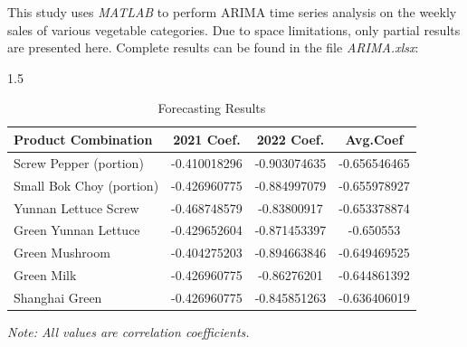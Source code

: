 \documentclass{article}
\begin{document}
	This study uses \textit{MATLAB} to perform ARIMA time series analysis on the weekly sales of various vegetable categories. Due to space limitations, only partial results are presented here. Complete results can be found in the file \textit{ARIMA.xlsx}:
	
	\begin{table}[h]
		\centering
		\caption{Forecasting Results}
		\renewcommand{\heavyrulewidth}{1.2pt}
		\begin{spacing}{1.5} %
			\begin{tabular}{@{}lccc@{}}
				\toprule
				\textbf{\centering Product Combination} & \textbf{2021 Coef.} & \textbf{2022 Coef.} & \textbf{Avg.Coef} \\
				\midrule
				Screw Pepper (portion) & -0.410018296 & -0.903074635 & -0.656546465 \\
				Small Bok Choy (portion) & -0.426960775 & -0.884997079 & -0.655978927 \\
				Yunnan Lettuce Screw & -0.468748579 & -0.83800917 & -0.653378874 \\
				Green Yunnan Lettuce & -0.429652604 & -0.871453397 & -0.650553 \\
				Green Mushroom & -0.404275203 & -0.894663846 & -0.649469525 \\
				Green Milk & -0.426960775 & -0.86276201 & -0.644861392 \\
				Shanghai Green & -0.426960775 & -0.845851263 & -0.636406019 \\
				\bottomrule
			\end{tabular}
		\end{spacing}
		\footnotesize \textit{Note: All values are correlation coefficients.}
	\end{table}
	\renewcommand{\heavyrulewidth}{1.2pt}
\end{document}
